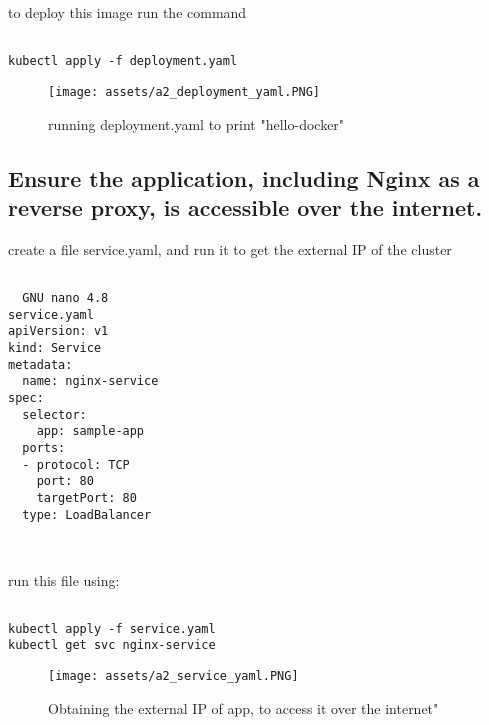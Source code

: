 \documentclass[12pt]{article}
\begin{document}
to deploy this image run the command

\begin{listing}[htbp]
\begin{verbatim}

kubectl apply -f deployment.yaml

\end{verbatim}
\end{listing}

\begin{figure}[H]
    \centering
    \texttt{[image: assets/a2\_deployment\_yaml.PNG]}
    \caption{running deployment.yaml to print "hello-docker"}
    \label{fig:logo}
\end{figure}

\subsection{Ensure the application, including Nginx as a reverse proxy, is accessible over the internet.}

create a file service.yaml, and run it to get the external IP of the cluster

\begin{listing}[htbp]
\begin{verbatim}

  GNU nano 4.8                                                   service.yaml                                                              
apiVersion: v1
kind: Service
metadata:
  name: nginx-service
spec:
  selector:
    app: sample-app
  ports:
  - protocol: TCP
    port: 80
    targetPort: 80
  type: LoadBalancer



\end{verbatim}
\end{listing}

run this file using:

\begin{listing}[H]
\begin{verbatim}

kubectl apply -f service.yaml
kubectl get svc nginx-service

\end{verbatim}
\end{listing}

\begin{figure}[H]
    \centering
    \texttt{[image: assets/a2\_service\_yaml.PNG]}
    \caption{Obtaining the external IP of app, to access it over the internet"}
    \label{fig:logo}
\end{figure}
\end{document}

